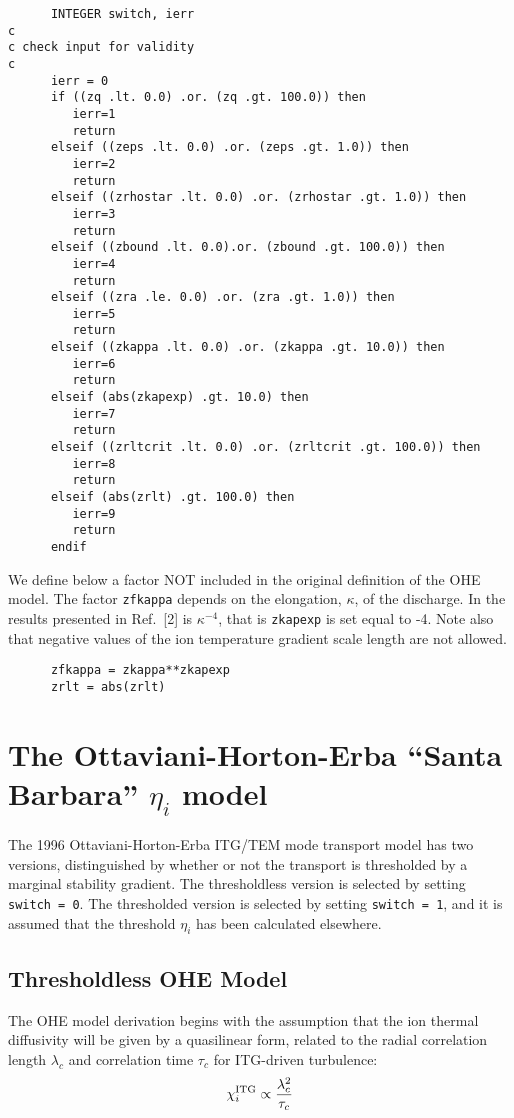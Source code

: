 \begin{verbatim}
      INTEGER switch, ierr
c
c check input for validity
c
      ierr = 0
      if ((zq .lt. 0.0) .or. (zq .gt. 100.0)) then 
         ierr=1
         return
      elseif ((zeps .lt. 0.0) .or. (zeps .gt. 1.0)) then
         ierr=2
         return
      elseif ((zrhostar .lt. 0.0) .or. (zrhostar .gt. 1.0)) then
         ierr=3
         return
      elseif ((zbound .lt. 0.0).or. (zbound .gt. 100.0)) then
         ierr=4
         return
      elseif ((zra .le. 0.0) .or. (zra .gt. 1.0)) then
         ierr=5
         return
      elseif ((zkappa .lt. 0.0) .or. (zkappa .gt. 10.0)) then
         ierr=6
         return
      elseif (abs(zkapexp) .gt. 10.0) then
         ierr=7
         return
      elseif ((zrltcrit .lt. 0.0) .or. (zrltcrit .gt. 100.0)) then
         ierr=8
         return
      elseif (abs(zrlt) .gt. 100.0) then
         ierr=9
         return
      endif
\end{verbatim}

We define below a factor NOT included in the original definition of
the OHE model.  The factor {\tt zfkappa} depends on the elongation,
$\kappa$, of the discharge.  In the results presented in Ref.~[2] is
$\kappa^{-4}$, that is {\tt zkapexp} is set equal to -4.  Note also
that negative values of the ion temperature gradient scale length are
not allowed.

\begin{verbatim}
      zfkappa = zkappa**zkapexp
      zrlt = abs(zrlt)
\end{verbatim}

\section{The Ottaviani-Horton-Erba ``Santa Barbara'' $\eta_i$ model}

The 1996 Ottaviani-Horton-Erba ITG/TEM mode transport model \cite{ohe97}
has two versions, distinguished by whether or not the transport is
thresholded by a marginal stability gradient.  The thresholdless version
is selected by setting {\tt switch = 0}.  The thresholded version is
selected by setting {\tt switch = 1}, and it is assumed that the
threshold $\eta_i$ has been calculated elsewhere.

\subsection{Thresholdless OHE Model}

The OHE model derivation begins with the assumption that the ion thermal
diffusivity will be given by a quasilinear form, related to the
radial correlation length $\lambda_c$ and correlation time $\tau_c$
for ITG-driven turbulence:
\[ \chi_i^{\rm ITG} \propto \frac{\lambda_c^2}{\tau_c} \]

